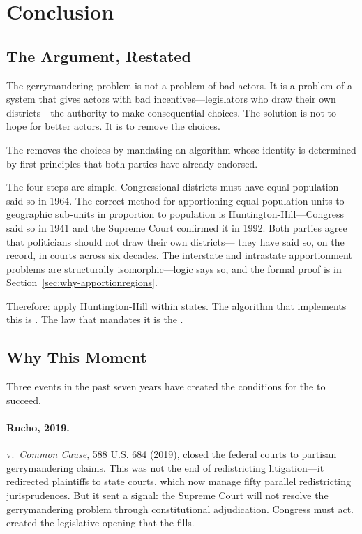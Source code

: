 \section{Conclusion}
\label{sec:conclusion}

\subsection{The Argument, Restated}

The gerrymandering problem is not a problem of bad actors.
It is a problem of a system that gives actors with bad incentives---legislators
who draw their own districts---the authority to make consequential choices.
The solution is not to hope for better actors.
It is to remove the choices.

The \dia{} removes the choices by mandating an algorithm whose identity is
determined by first principles that both parties have already endorsed.

The four steps are simple.
Congressional districts must have equal population---\wesberry{} said so in 1964.
The correct method for apportioning equal-population units to geographic
sub-units in proportion to population is Huntington-Hill---Congress said so
in 1941 and the Supreme Court confirmed it in 1992.
Both parties agree that politicians should not draw their own districts---
they have said so, on the record, in courts across six decades.
The interstate and intrastate apportionment problems are structurally
isomorphic---logic says so, and the formal proof is in
Section~\ref{sec:why-apportionregions}.

Therefore: apply Huntington-Hill within states.
The algorithm that implements this is \ar{}.
The law that mandates it is the \dia{}.

\subsection{Why This Moment}

Three events in the past seven years have created the conditions for the
\dia{} to succeed.

\paragraph{Rucho, 2019.}
\rucho{} v.\ \textit{Common Cause}, 588 U.S. 684 (2019), closed the federal
courts to partisan gerrymandering claims.
This was not the end of redistricting litigation---it redirected plaintiffs
to state courts, which now manage fifty parallel redistricting jurisprudences.
But it sent a signal: the Supreme Court will not resolve the gerrymandering
problem through constitutional adjudication.
Congress must act.
\rucho{} created the legislative opening that the \dia{} fills.

